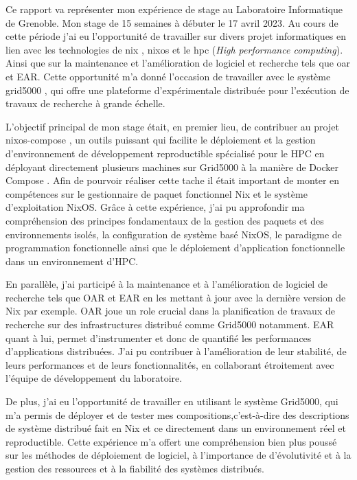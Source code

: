 \documentclass[a4paper,french,12pt, titlepage]{article}
\begin{document}
Ce rapport va représenter mon expérience de stage au Laboratoire
Informatique de Grenoble. Mon stage de 15 semaines à débuter le 17 avril
2023. Au cours de cette période j'ai eu l'opportunité de travailler sur
divers projet informatiques en lien avec les technologies de \Gls{nix}
\cite{nix2017}, \Gls{nixos} \cite{nixos2010} et le \Gls{hpc} (\emph{High
performance computing}). Ainsi que sur la maintenance et l'amélioration
de logiciel et recherche tels que \Gls{oar} \cite{oar2005} et EAR. Cette
opportunité m'a donné l'occasion de travailler avec le système
\Gls{grid5000} \cite{grid5000-2005}, qui offre une plateforme
d'expérimentale distribuée pour l'exécution de travaux de recherche à
grande échelle.\newline

L'objectif principal de mon stage était, en premier lieu, de contribuer
au projet \Gls{nixos-compose} \cite{nixoscompose2022}, un outils
puissant qui facilite le déploiement et la gestion d'environnement de
développement reproductible spécialisé pour le HPC en déployant
directement plusieurs machines sur Grid5000 à la manière de Docker
Compose \cite{dockercompose2021}. Afin de pourvoir réaliser cette tache
il était important de monter en compétences sur le gestionnaire de
paquet fonctionnel Nix et le système d'exploitation NixOS. Grâce à cette
expérience, j'ai pu approfondir ma compréhension des principes
fondamentaux de la gestion des paquets et des environnements isolés, la
configuration de système basé NixOS, le paradigme de programmation
fonctionnelle ainsi que le déploiement d'application fonctionnelle dans
un environnement d'HPC.\newline

En parallèle, j'ai participé à la maintenance et à l'amélioration de
logiciel de recherche tels que OAR et EAR en les mettant à jour avec la
dernière version de Nix par exemple. OAR joue un role crucial dans la
planification de travaux de recherche sur des infrastructures distribué
comme Grid5000 notamment. EAR quant à lui, permet d'instrumenter et donc
de quantifié les performances d'applications distribuées. J'ai pu
contribuer à l'amélioration de leur stabilité, de leurs performances et
de leurs fonctionnalités, en collaborant étroitement avec l'équipe de
développement du laboratoire.\newline

De plus, j'ai eu l'opportunité de travailler en utilisant le système
Grid5000, qui m'a permis de déployer et de tester mes
\glspl{composition},c'est-à-dire des descriptions de système distribué
fait en Nix et ce directement dans un environnement réel et
reproductible. Cette expérience m'a offert une compréhension bien plus
poussé sur les méthodes de déploiement de logiciel, à l'importance de
d'évolutivité et à la gestion des ressources et à la fiabilité des
systèmes distribués.\newline
\end{document}
